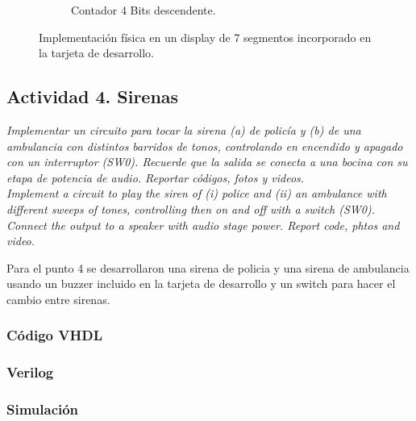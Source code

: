 \begin{figure}[H]
\begin{subfigure}{0.45\linewidth}
        \caption{Contador 4 Bits descendente.}\label{fig:R2-2}
    \end{subfigure}
    \caption{Implementación física en un display de 7 segmentos incorporado en la tarjeta de desarrollo.}\label{fig:leds3}
\end{figure}

\subsection*{Actividad 4. Sirenas}

\textit{\textcolor{Verde}{Implementar un circuito para tocar la sirena (a) de policía y (b) de una ambulancia con
distintos barridos de tonos, controlando en encendido y apagado con un interruptor
(SW0). Recuerde que la salida se conecta a una bocina con su etapa de potencia de audio.
Reportar códigos, fotos y videos.\\
Implement a circuit to play the siren of (i) police and (ii) an ambulance with different
sweeps of tones, controlling then on and off with a switch (SW0). Connect the output to
a speaker with audio stage power. Report code, phtos and video.}}

Para el punto 4 se desarrollaron una sirena de policia y una sirena de ambulancia usando un buzzer incluido en la tarjeta de desarrollo y un switch para hacer el cambio entre sirenas.

\subsubsection*{Código VHDL}



\subsubsection*{Verilog}



\subsubsection*{Simulación}

